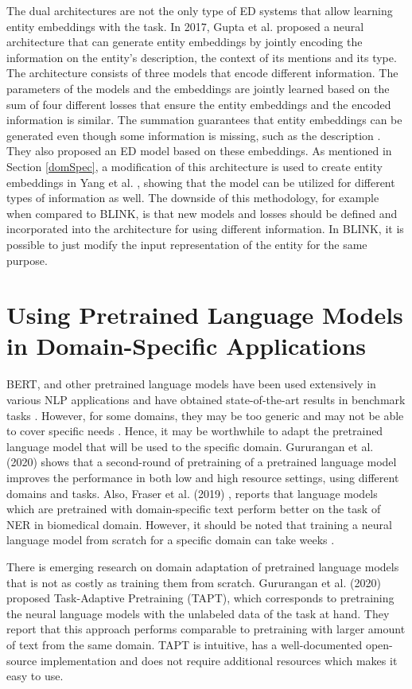 \documentclass{report}
\theoremstyle{definition}
\theoremstyle{remark}
\begin{document}
The dual architectures are not the only type of ED systems that allow learning entity embeddings with the task. In 2017, Gupta et al. \cite{gupta} proposed a neural architecture that can generate entity embeddings by jointly encoding the information on the entity's description, the context of its mentions and its type. The architecture consists of three models that encode different information. The parameters of the models and the embeddings are jointly learned based on the sum of four different losses that ensure the entity embeddings and the encoded information is similar. The summation guarantees that entity embeddings can be generated even though some information is missing, such as the description \cite{gupta}. They also proposed an ED model based on these embeddings. As mentioned in Section \ref{domSpec}, a modification of this architecture is used to create entity embeddings in Yang et al. \cite{cosmetic}, showing that the model can be utilized for different types of information as well. The downside of this methodology, for example when compared to BLINK, is that new models and losses should be defined and incorporated into the architecture for using different information. In BLINK, it is possible to just modify the input representation of the entity for the same purpose.

\section{Using Pretrained Language Models in Domain-Specific Applications}
\label{preLMDiffDomain}
BERT, and other pretrained language models have been used extensively in various NLP applications and have obtained state-of-the-art results in benchmark tasks \cite{pretrainedLM}. However, for some domains, they may be too generic and may not be able to cover specific needs \cite{quote2}. Hence, it may be worthwhile to adapt the pretrained language model that will be used to the specific domain. Gururangan et al. (2020) \cite{DontStop} shows that a second-round of pretraining of a pretrained language model improves the performance in both low and high resource settings, using different domains and tasks. Also, Fraser et al. (2019) \cite{quote3}, reports that language models which are pretrained with domain-specific text perform better on the task of NER in biomedical domain. However, it should be noted that training a neural language model from scratch for a specific domain can take weeks \cite{tritrain}. 

There is emerging research on domain adaptation of pretrained language models that is not as costly as training them from scratch. Gururangan et al. (2020) \cite{DontStop} proposed Task-Adaptive Pretraining (TAPT), which corresponds to pretraining the neural language models with the unlabeled data of the task at hand. They report that this approach performs comparable to pretraining with larger amount of text from the same domain. TAPT is intuitive, has a well-documented open-source implementation and does not require additional resources which makes it easy to use. 
\end{document}
